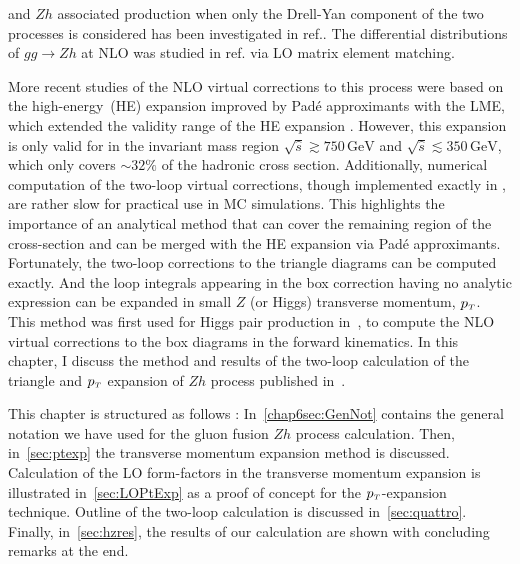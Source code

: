 and $ Z h$ associated production when only the Drell-Yan component of the two processes is considered has been investigated in ref.\cite{Harlander:2018yns}. The differential distributions of $g g \rightarrow Zh$  at NLO was studied in ref.\cite{Hespel:2015zea} via LO matrix element matching. 
\par More recent studies of the NLO virtual corrections to this process were based on the high-energy~(HE) expansion improved by Pad\'e approximants with the LME, which extended the validity range of the HE expansion \cite{Davies:2020drs}. However, this expansion is only valid for in the invariant mass region $\sqrt{\hat{s}}  \gtrsim 750\, \si{\GeV} $ and $\sqrt{\hat{s}}  \lesssim 350\,  \si{\GeV}$,  which only covers $\sim 32\%$ of the hadronic cross section. Additionally, numerical computation of the two-loop virtual corrections, though implemented exactly in  \cite{Chen:2020gae}, are rather slow for practical use in MC simulations.  This highlights the importance of an analytical method that can cover the remaining region of the cross-section and can be merged with the HE expansion via Pad\'e approximants. Fortunately, the two-loop corrections to the triangle diagrams can be computed exactly. And the loop integrals appearing in the box correction having no analytic expression can be expanded in small  $Z$ (or Higgs) 
transverse momentum, $p_{\scriptscriptstyle T}$. This method was first used for Higgs pair production in~\cite{Bonciani:2018omm}, to compute the NLO virtual corrections to the box diagrams in the forward kinematics.  In this chapter, I discuss the method and results of the two-loop calculation of the triangle and $p_{\scriptscriptstyle T}$ expansion of $Zh$ process published in~\cite{Alasfar:2021ppe}. 
\par This chapter is structured as follows : In~\autoref{chap6sec:GenNot} contains the general notation we have used for the gluon fusion $Zh$ process calculation. Then, in~\autoref{sec:ptexp} the transverse momentum expansion method is discussed.  Calculation of the LO form-factors in the transverse momentum expansion is illustrated in~\autoref{sec:LOPtExp} as a proof of concept for the $p_{\scriptscriptstyle T}$-expansion technique. Outline of the two-loop calculation is discussed in~\autoref{sec:quattro}. Finally, in~\autoref{sec:hzres}, the results of our calculation are shown with concluding remarks at the end. 

